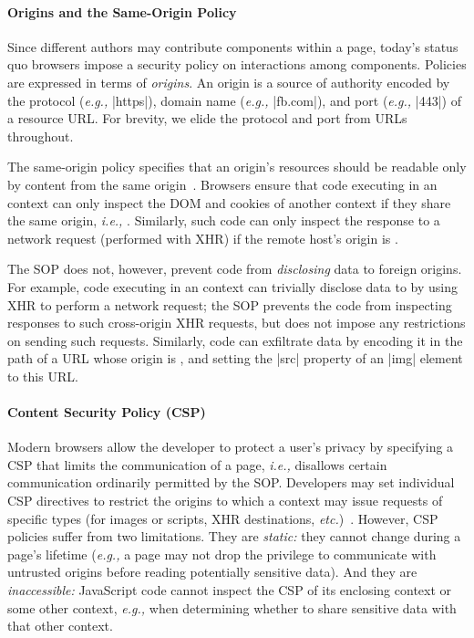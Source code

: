 \paragraph{Origins and the Same-Origin Policy}
Since different authors may contribute components within a page,
today's status quo browsers impose a security policy on interactions
among components. Policies are expressed in terms of \emph{origins}.
An origin is a source of authority encoded by the protocol (\emph{e.g.,}
\js|https|), domain name (\emph{e.g.,} \js|fb.com|), and port (\emph{e.g.,} \js|443|)
of a resource URL. For brevity, we elide the protocol and
port from URLs throughout.

The same-origin policy specifies that an origin's
resources should be readable only by content from the same
origin~\cite{rfc6454, googlehandbook, VanKesteren2012}.  Browsers
ensure that code executing in an  context can only
inspect the DOM and cookies of another context if they share the same
origin, \emph{i.e.,} . Similarly, such code can only
inspect the response to a network request (performed with XHR) if the
remote host's origin is .
%
 
The SOP does not, however, prevent code from \emph{disclosing} data to
foreign origins. For example, code executing in an 
context can trivially disclose data to  by using XHR to
perform a network request; the SOP prevents the code from
inspecting responses to such cross-origin XHR requests, but does not
impose any restrictions on sending such requests.
Similarly, code can exfiltrate data by encoding it in the path of a
URL whose origin is , and setting the \js|src| property
of an \js|img| element to this URL.

\paragraph{Content Security Policy (CSP)}

Modern browsers allow the developer to protect a user's privacy by
specifying a CSP that limits the communication of a page, \emph{i.e.,}
disallows certain communication ordinarily permitted by the SOP\@.
Developers may set individual CSP directives to restrict the origins
to which a context may issue requests of specific types (for images or
scripts, XHR destinations, \emph{etc.})~\cite{csp}. However, CSP policies
suffer from two limitations. They are {\em static:} they
cannot change during a page's lifetime (\emph{e.g.,} a page may not
drop the privilege to communicate with untrusted origins before
reading potentially sensitive data). And they are {\em inaccessible:}
JavaScript code cannot inspect the CSP of its enclosing context or
some other context, \emph{e.g.,} when determining whether to share
sensitive data with that other context.

